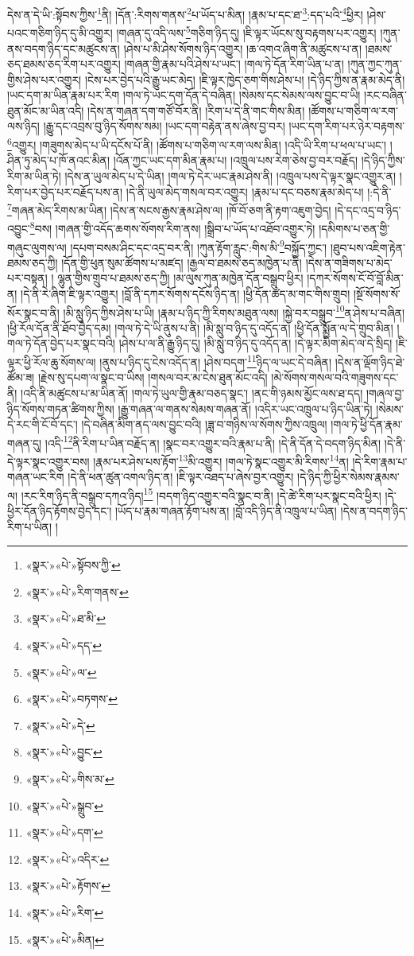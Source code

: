 དེས་ན་དེ་ཡི་:སྟོབས་ཀྱིས་\footnote{«སྣར་»«པེ་»སྟོབས་ཀྱི་}ནི། །དོན་:རིགས་གནས་\footnote{«སྣར་»«པེ་»རིག་གནས་}པ་ཡོད་པ་མིན། །རྣམ་པ་དང་ཐ་\footnote{«སྣར་»«པེ་»ཐ་མི་}:དད་པའི་\footnote{«སྣར་»«པེ་»དད་}ཕྱིར། །ཤེས་པའང་གཅིག་ཉིད་དུ་མི་འགྱུར། །གཞན་དུ་འདི་ལས་\footnote{«སྣར་»«པེ་»ལ་}གཅིག་ཉིད་དུ། །ཇི་ལྟར་ཡོངས་སུ་བརྟགས་པར་འགྱུར། །ཀུན་ནས་བདག་ཉིད་དང་མཚུངས་ན། །ཤེས་པ་མི་ཤེས་སོགས་ཉིད་འགྱུར། །ཆ་འགའ་ཞིག་ནི་མཚུངས་པ་ན། །ཐམས་ཅད་ཐམས་ཅད་རིག་པར་འགྱུར། །གཞན་གྱི་རྣམ་པའི་ཤེས་པ་ཡང་། །གལ་ཏེ་དོན་རིག་ཡིན་པ་ན། །ཀུན་ཀྱང་ཀུན་གྱིས་ཤེས་པར་འགྱུར། །ངེས་པར་བྱེད་པའི་རྒྱུ་ཡང་མེད། །ཇི་ལྟར་ཁྱེད་ཅག་གིས་ཤེས་པ། །དེ་ཉིད་ཀྱིས་ན་རྣམ་མེད་ནི། །ཡང་དག་མ་ཡིན་རྣམ་པར་རིག །གལ་ཏེ་ཡང་དག་དོན་དེ་བཞིན། །སེམས་དང་སེམས་ལས་བྱུང་བ་ཡི། །རང་བཞིན་ཐུན་མོང་མ་ཡིན་འདི། །དེས་ན་གཞན་དག་གཙོ་བོར་ནི། །རིག་པ་དེ་ནི་གང་གིས་མིན། །ཚོགས་པ་གཅིག་ལ་རག་ལས་ཉིད། །རྒྱུ་དང་འབྲས་བུ་ཉིད་སོགས་སམ། །ཡང་དག་བརྟེན་ནས་ཞེས་བྱ་བར། །ཡང་དག་རིག་པར་ཉེར་བརྟགས་\footnote{«སྣར་»«པེ་»བཏགས་}འགྱུར། །གཟུགས་མེད་པ་ཡི་དངོས་པོ་ནི། །ཚོགས་པ་གཅིག་ལ་རག་ལས་མིན། །འདི་ཡི་རིག་པ་ཕལ་པ་ཡང་། །ཤིན་ཏུ་མེད་པ་ཁོ་ནའང་མིན། །འོན་ཀྱང་ཡང་དག་མིན་རྣམ་པ། །འཁྲུལ་པས་རེག་ཅེས་བྱ་བར་བརྗོད། །དེ་ཉིད་ཀྱིས་རིག་མ་ཡིན་ཏེ། །དེས་ན་ཡུལ་མེད་པ་དེ་ཡིན། །གལ་ཏེ་དེར་ཡང་རྣམ་ཤེས་ནི། །འཁྲུལ་པས་དེ་ལྟར་སྣང་འགྱུར་ན། །རིག་པར་བྱེད་པར་བརྗོད་པས་ན། །དེ་ནི་ཡུལ་མེད་གསལ་བར་འགྱུར། །རྣམ་པ་དང་བཅས་རྣམ་མེད་པ། །:དེ་ནི་\footnote{«སྣར་»«པེ་»དེ་}གཞན་མེད་རིགས་མ་ཡིན། །དེས་ན་སངས་རྒྱས་རྣམ་ཤེས་ལ། །ཁོ་བོ་ཅག་ནི་རྟག་འཇུག་བྱེད། །དེ་དང་འདྲ་བ་ཉིད་འབྱུང་\footnote{«སྣར་»«པེ་»བྱུང་}བས། །གཞན་གྱི་འདོད་ཆགས་སོགས་རིག་ནས། །སྒྲིབ་པ་ཡོད་པ་འཐོབ་འགྱུར་ཏེ། །དམིགས་པ་ཅན་གྱི་གཞུང་ལུགས་ལ། །དཔག་བསམ་ཤིང་དང་འདྲ་བར་ནི། །ཀུན་རྟོག་རླུང་:གིས་མི་\footnote{«སྣར་»«པེ་»གིས་མ་}བསྐྱོད་ཀྱང་། །ཐུབ་པས་འཇིག་རྟེན་ཐམས་ཅད་ཀྱི། །དོན་གྱི་ཕུན་སུམ་ཚོགས་པ་མཛད། །རྒྱལ་བ་ཐམས་ཅད་མཁྱེན་པ་ནི། །དེས་ན་གཟིགས་པ་མེད་པར་བསྟན། །
ལྷུན་གྱིས་གྲུབ་པ་ཐམས་ཅད་ཀྱི། །མ་ལུས་ཀུན་མཁྱེན་དོན་བསྒྲུབ་ཕྱིར། །དཀར་སོགས་ངོ་བོ་བློ་མིན་ན། །དེ་ནི་རེ་ཞིག་ཇི་ལྟར་འགྱུར། །བློ་ནི་དཀར་སོགས་དངོས་ཉིད་ན། །ཕྱི་དོན་ཚད་མ་གང་གིས་གྲུབ། །སྔོ་སོགས་སོ་སོར་སྣང་བ་ནི། །མི་སླུ་ཉིད་ཀྱིས་ཤེས་པ་ཡི། །རྣམ་པ་ཉིད་ཀྱི་རིགས་མཐུན་ལས། །སྐྱེ་བར་བསྒྲུབ་\footnote{«སྣར་»«པེ་»སྒྲུབ་}ན་ཤེས་པ་བཞིན། །ཕྱི་རོལ་དོན་ནི་ཐོབ་བྱེད་དམ། །གལ་ཏེ་དེ་ཡི་ནུས་པ་ནི། །མི་སླུ་བ་ཉིད་དུ་འདོད་ན། །ཕྱི་དོན་སྨྱོན་ལ་དེ་གྲུབ་མིན། །གལ་ཏེ་དོན་བྱེད་པར་སྣང་བའི། །ཤེས་པ་ལ་ནི་རྒྱུ་ཉིད་དུ། །མི་སླུ་བ་ཉིད་དུ་འདོད་ན། །དེ་ལྟར་མིག་མེད་ལ་དེ་སྲིད། །ཇི་ལྟར་ཕྱི་རོལ་ཆུ་སོགས་ལ། །ནུས་པ་ཉིད་དུ་ངེས་འདོད་ན། །ཤེས་བདག་\footnote{«སྣར་»«པེ་»དག་}ཉིད་ལ་ཡང་དེ་བཞིན། །དེས་ན་ལྡོག་ཉིད་ཐེ་ཚོམ་ཟ། །རྗེས་སུ་དཔག་ལ་སྣང་བ་ཡིས། །གསལ་བར་མ་ངེས་ཐུན་མོང་འདི། །མེ་སོགས་གསལ་བའི་གཟུགས་དང་ནི། །འདི་ནི་མཚུངས་པ་མ་ཡིན་ནོ། །གལ་ཏེ་ཡུལ་གྱི་རྣམ་བཅད་སྣང་། །ནང་གི་ཉམས་མྱོང་ལས་ཐ་དད། །གཞལ་བྱ་ཉིད་སོགས་གཏན་ཚིགས་ཀྱིས། །རྒྱུ་གཞན་ལ་གནས་སེམས་གཞན་ནོ། །འདིར་ཡང་འཁྲུལ་པ་ཉིད་ཡིན་ཏེ། །སེམས་དེ་རང་གི་ངོ་བོ་དང་། །དེ་བཞིན་མིག་ནད་ལས་བྱུང་བའི། །ཟླ་བ་གཉིས་ལ་སོགས་ཀྱིས་འཁྲུལ། །གལ་ཏེ་ཕྱི་དོན་རྣམ་གཞན་དུ། །འདི་\footnote{«སྣར་»«པེ་»འདིར་}ནི་རིག་པ་ཡིན་བརྗོད་ན། །སྣང་བར་འགྱུར་བའི་རྣམ་པ་ནི། །དེ་ནི་དོན་དེ་བདག་ཉིད་མིན། །དེ་ནི་དེ་ལྟར་སྣང་འགྱུར་བས། །རྣམ་པར་ཤེས་པས་རྟོག་\footnote{«སྣར་»«པེ་»རྟོགས་}མི་འགྱུར། །གལ་ཏེ་སྣང་འགྱུར་མི་རིགས་\footnote{«སྣར་»«པེ་»རིག་}ན། །དེ་རིག་རྣམ་པ་གཞན་ཡང་རིག །དེ་ནི་ཕན་ཚུན་འགལ་ཉིད་ན། །ཇི་ལྟར་འཐད་པ་ཞེས་བྱར་འགྱུར། །དེ་ཉིད་ཀྱི་ཕྱིར་སེམས་རྣམས་ལ། །རང་རིག་ཉིད་ནི་བསྒྲུབ་དཀའ་ཉིད།\footnote{«སྣར་»«པེ་»མིན།} །བདག་ཉིད་འགྱུར་བའི་སྣང་བ་ནི། །དེ་ཚེ་རིག་པར་སྣང་བའི་ཕྱིར། །དེ་ཕྱིར་དོན་ཉིད་རྟོགས་བྱེད་དང་། །ཡོད་པ་རྣམ་གཞན་རྟོག་པས་ན། །བློ་འདི་ཉིད་ནི་འཁྲུལ་པ་ཡིན། །དེས་ན་བདག་ཉིད་རིག་པ་ཡིན། །
